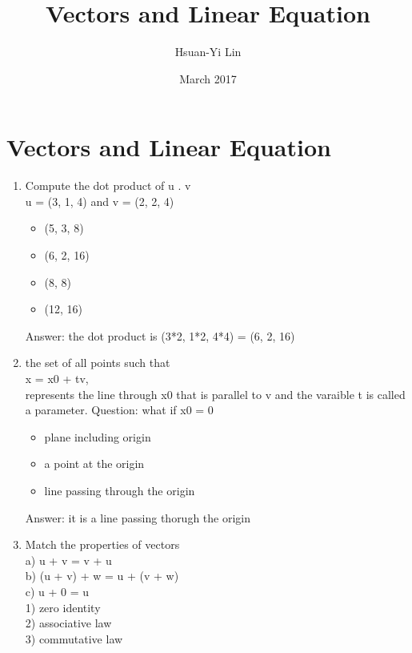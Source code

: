 \documentclass{article}
\title{Vectors and Linear Equation}
\author{Hsuan-Yi Lin }
\date{March 2017}
\begin{document}
\maketitle

\section{Vectors and Linear Equation}
\begin{enumerate}
    \item Compute the dot product of u . v \\
        u = (3, 1, 4) and v = (2, 2, 4)
        
         \begin{itemize}
            \item (5, 3, 8)
            \item (6, 2, 16)
            \item (8, 8)
            \item (12, 16)
        \end{itemize}
        
        Answer: the dot product is (3*2, 1*2, 4*4) = (6, 2, 16)
    
    \item the set of all points such that \\
    x = x0 + tv,\\
    represents the line through x0 that is parallel to v and the varaible t is called a parameter.
    Question: what if x0 = 0
    
        \begin{itemize}
            \item plane including origin
            \item a point at the origin 
            \item line passing through the origin
        \end{itemize}    
    
        Answer: it is a line passing thorugh the origin
        
    \item Match the properties of vectors \\
    a) u + v = v + u \\
    b) (u + v) + w = u + (v + w) \\
    c) u + 0 = u \\
    1) zero identity \\ 
    2) associative law \\
    3) commutative law 
        

\end{enumerate}
\end{document}
